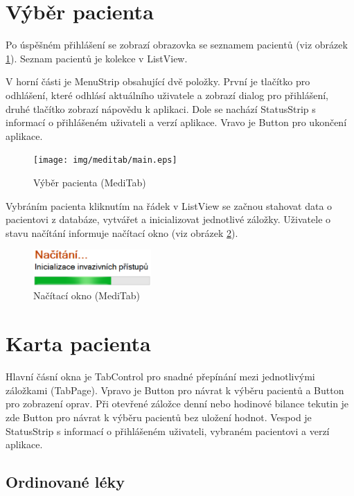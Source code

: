 \section{Výběr pacienta}

Po úspěšném přihlášení se zobrazí obrazovka se seznamem pacientů (viz obrázek \ref{fig:main}). Seznam pacientů je kolekce v ListView.

V horní části je MenuStrip obsahující dvě položky. První je tlačítko pro odhlášení, které odhlásí aktuálního uživatele a zobrazí dialog pro přihlášení, druhé tlačítko zobrazí nápovědu k aplikaci. Dole se nachází StatusStrip s informací o přihlášeném uživateli a verzí aplikace. Vravo je Button pro ukončení aplikace.

\begin{figure}[H]
	\centering
	\texttt{[image: img/meditab/main.eps]}
	\caption{Výběr pacienta (MediTab)}
  \label{fig:main}
\end{figure}


Vybráním pacienta kliknutím na řádek v ListView se začnou stahovat data o pacientovi z databáze, vytvářet a inicializovat jednotlivé záložky. Uživatele o stavu načítání informuje načítací okno (viz obrázek \ref{fig:load}).

\begin{figure}[H]
	\centering
	\includegraphics[width=0.4\textwidth]{img/meditab/loading.eps}
	\caption{Načítací okno (MediTab)}
  \label{fig:load}
\end{figure}



\section{Karta pacienta}

Hlavní čásní okna je TabControl pro snadné přepínání mezi jednotlivými záložkami (TabPage). Vpravo je Button pro návrat k výběru pacientů a Button pro zobrazení oprav. Při otevřené záložce denní nebo hodinové bilance tekutin je zde Button pro návrat k výběru pacientů bez uložení hodnot. Vespod je StatusStrip s informací o přihlášeném uživateli, vybraném pacientovi a verzí aplikace.

\subsection{Ordinované léky}

